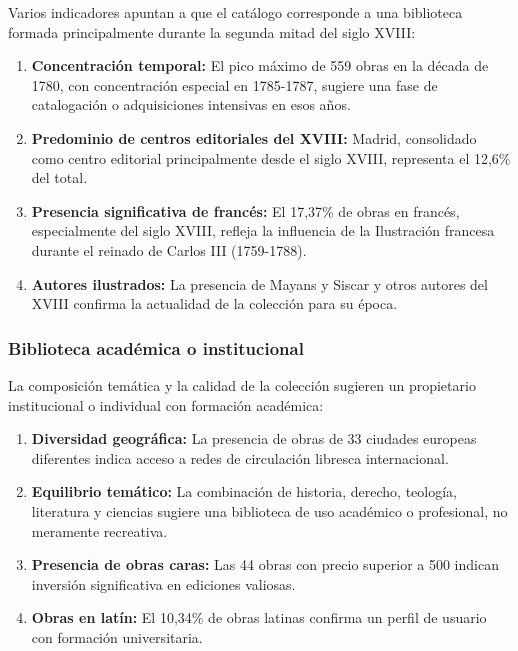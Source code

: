\documentclass[12pt,a4paper]{article}
\begin{document}
Varios indicadores apuntan a que el catálogo corresponde a una biblioteca formada principalmente durante la segunda mitad del siglo XVIII:

\begin{enumerate}
    \item \textbf{Concentración temporal:} El pico máximo de 559 obras en la década de 1780, con concentración especial en 1785-1787, sugiere una fase de catalogación o adquisiciones intensivas en esos años.

    \item \textbf{Predominio de centros editoriales del XVIII:} Madrid, consolidado como centro editorial principalmente desde el siglo XVIII, representa el 12,6\% del total.

    \item \textbf{Presencia significativa de francés:} El 17,37\% de obras en francés, especialmente del siglo XVIII, refleja la influencia de la Ilustración francesa durante el reinado de Carlos III (1759-1788).

    \item \textbf{Autores ilustrados:} La presencia de Mayans y Siscar y otros autores del XVIII confirma la actualidad de la colección para su época.
\end{enumerate}

\subsubsection{Biblioteca académica o institucional}

La composición temática y la calidad de la colección sugieren un propietario institucional o individual con formación académica:

\begin{enumerate}
    \item \textbf{Diversidad geográfica:} La presencia de obras de 33 ciudades europeas diferentes indica acceso a redes de circulación libresca internacional.

    \item \textbf{Equilibrio temático:} La combinación de historia, derecho, teología, literatura y ciencias sugiere una biblioteca de uso académico o profesional, no meramente recreativa.

    \item \textbf{Presencia de obras caras:} Las 44 obras con precio superior a 500 indican inversión significativa en ediciones valiosas.

    \item \textbf{Obras en latín:} El 10,34\% de obras latinas confirma un perfil de usuario con formación universitaria.
\end{enumerate}
\end{document}
